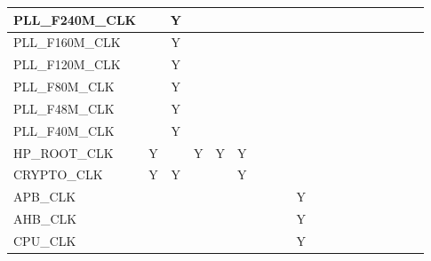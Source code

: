\documentclass[main\_\_CN.tex]{subfiles}
\begin{document}
\begin{landscape}
\begin{tiny}
\begin{longtable}[c]{|m{1.7cm}|c|c|c|c|c|c|c|c|C{1.5cm}|c|c|c|c|c|c|c|c|c|}
    PLL\_F240M\_CLK &   & Y &   &  &   &   &   &   &  &   &   &   &   &   &   &   &   &    \\ \hline
    PLL\_F160M\_CLK &   & Y &   &  &   &   &   &   &  &   &   &   &   &   &   &   &   &   \\ \hline
    PLL\_F120M\_CLK &   & Y &   &  &   &   &   &   &  &   &   &   &   &   &   &   &   &    \\ \hline
    PLL\_F80M\_CLK &   & Y &   &  &   &   &   &   &  &   &   &   &   &   &   &   &   &    \\ \hline
    PLL\_F48M\_CLK &   & Y &   &  &   &   &   &   &  &   &   &   &   &   &   &   &   &   \\ \hline
    PLL\_F40M\_CLK &   & Y &   &  &   &   &   &   &  &   &   &   &   &   &   &   &   &    \\ \hline
    HP\_ROOT\_CLK & Y &   & Y & Y & Y &   &   &   &  &   &   &   &   &   &   &   &   &    \\ \hline
    CRYPTO\_CLK & Y & Y &   &  & Y &   &   &   &  &   &   &   &   &   &   &   &   &    \\ \hline
    APB\_CLK &   &   &   &  &   &   &   &   &   Y &   &   &   &   &   &   &   &  &  \\ \hline
    AHB\_CLK &   &   &   &  &   &   &   &   &   Y &   &   &   &   &   &   &   &  &  \\ \hline
    CPU\_CLK &   &   &   &  &   &   &   &   &   Y &   &   &   &   &   &   &   &  &  \\ \hline
\end{longtable}
\newpage


\end{tiny}
\end{landscape}
\end{document}
